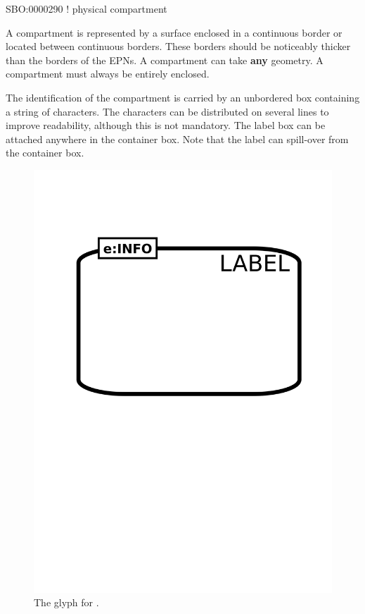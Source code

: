 \begin{glyphDescription}

\glyphSboTerm  SBO:0000290 ! physical compartment

\glyphContainer A compartment is represented by a surface enclosed in a continuous border or located between continuous borders. These borders should be noticeably thicker than the borders of the EPNs. A compartment can take \textbf{any} geometry. A compartment must always be entirely enclosed.

\glyphLabel The identification of the compartment is carried by an unbordered box containing a string of characters. The characters can be distributed on several lines to improve readability, although this is not mandatory. The label box can be attached anywhere in the container box. Note that the label can spill-over from the container box.

\end{glyphDescription}

\begin{figure}[htb]
  \centering
  \includegraphics[scale = 0.3]{images/compartment}
  \caption{The \PD glyph for .}
  \label{fig:techref:compartment}
\end{figure}


